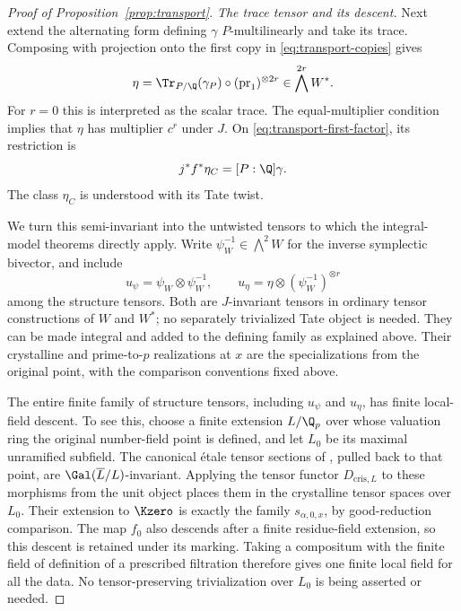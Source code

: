 \begin{proof}[Proof of Proposition~\ref{prop:transport}]
\medskip\noindent
\emph{The trace tensor and its descent.}
Next extend the alternating form defining $\gamma$
$P$-multilinearly and take its trace.  Composing with projection
onto the first copy in \eqref{eq:transport-copies} gives
\begin{equation}
 \eta=\Tr_{P/\Q}(\gamma_P)\circ
              (\operatorname{pr}_1)^{\otimes 2r}
       \in\bigwedge^{2r}W^*.
 \label{eq:transport-trace-tensor}
\end{equation}
For $r=0$ this is interpreted as the scalar trace.
The equal-multiplier condition implies that $\eta$ has multiplier
$c^r$ under $J$.  On \eqref{eq:transport-first-factor}, its
restriction is
\begin{equation}
 j^*f^*\eta_C=[P:\Q]\gamma.
 \label{eq:transport-trace-restriction}
\end{equation}
The class $\eta_C$ is understood with its Tate twist.

We turn this semi-invariant into the untwisted tensors to which
the integral-model theorems directly apply.  Write
$\psi_W^{-1}\in\bigwedge^2W$ for the inverse symplectic
bivector, and include
\begin{equation}
 u_\psi=\psi_W\otimes\psi_W^{-1},\qquad
 u_\eta=\eta\otimes(\psi_W^{-1})^{\otimes r}
 \label{eq:transport-untwisted-tensors}
\end{equation}
among the structure tensors.  Both are $J$-invariant tensors in
ordinary tensor constructions of $W$ and $W^*$; no separately
trivialized Tate object is needed.  They can be made integral and
added to the defining family as explained above.  Their
crystalline and prime-to-$p$ realizations at $x$ are the
specializations from the original point, with the comparison
conventions fixed above.

\label{par:transport-tensor-descent}
The entire finite family of structure tensors, including
$u_\psi$ and $u_\eta$, has finite local-field descent.  To see
this, choose a finite extension $L/\Q_p$ over whose valuation
ring the original number-field point is defined, and let $L_0$
be its maximal unramified subfield.  The canonical \'etale
tensor sections of \cite[\S2.1.4]{KisinZhou2025}, pulled back
to that point, are $\Gal(\overline L/L)$-invariant.  Applying
the tensor functor $D_{\mathrm{cris},L}$ to these morphisms
from the unit object places them in the crystalline tensor
spaces over $L_0$.  Their extension to $\Kzero$ is exactly
the family $s_{\alpha,0,x}$, by good-reduction comparison.
The map $f_0$ also descends after a finite residue-field
extension, so this descent is retained under its marking.
Taking a compositum with the finite field of definition of a
prescribed filtration therefore gives one finite local field
for all the data.  No tensor-preserving trivialization over
$L_0$ is being asserted or needed.


\end{proof}
